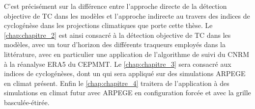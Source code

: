 \documentclass[../main.tex]{subfiles}
\begin{document}
C'est précisément sur la différence entre l'approche directe de la détection objective de TC dans les modèles et l'approche indirecte au travers des indices de
cyclogénèse dans les projections climatiques que porte cette thèse. Le \cref{chap:chapitre_2} est ainsi consacré à la détection objective de TC dans les
modèles, avec un tour d'horizon des différents traqueurs employés dans la littérature, avec en particulier une application de l'algorithme de suivi du CNRM à la
réanalyse ERA5 du CEPMMT. Le \cref{chap:chapitre_3} sera consacré aux indices de cyclogénèses, dont un qui sera appliqué sur des simulations ARPEGE en climat
présent. Enfin le \cref{chap:chapitre_4} traitera de l'application à des simulations en climat futur avec ARPEGE en configuration forcée et avec la grille
basculée-étirée.
\end{document}
